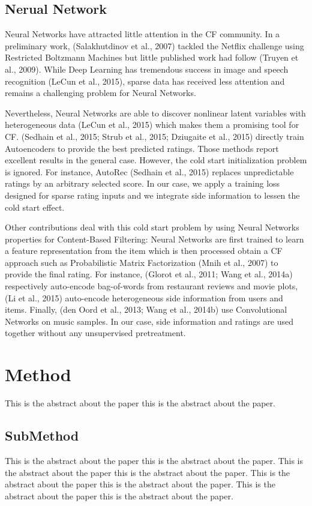 \documentclass{sig-alternate-05-2015}
\begin{document}
\subsection{Nerual Network}
Neural Networks have attracted little attention in the CF community.
In a preliminary work, (Salakhutdinov et al., 2007) tackled the Netflix challenge using Restricted Boltzmann Machines but little published work had follow (Truyen et al., 2009).
While Deep Learning has tremendous success in image and speech recognition (LeCun
et al., 2015), sparse data has received less attention and remains a challenging problem for Neural Networks.

Nevertheless, Neural Networks are able to discover nonlinear latent variables with heterogeneous data (LeCun et al., 2015) which makes them a promising tool for CF.
(Sedhain et al., 2015; Strub et al., 2015; Dziugaite et al., 2015) directly train Autoencoders to provide the best predicted ratings.
Those methods report excellent results in the general case.
However, the cold start initialization problem is ignored.
For instance, AutoRec (Sedhain et al., 2015) replaces unpredictable ratings by an arbitrary selected score.
In our case, we apply a training loss designed for sparse rating inputs and we integrate side information to lessen the cold start effect.

Other contributions deal with this cold start problem by using Neural Networks properties for Content-Based Filtering: Neural Networks are first trained to learn a feature representation from the item which is then processed obtain a CF approach such as Probabilistic Matrix Factorization (Mnih et al., 2007) to provide the final rating.
For instance, (Glorot et al., 2011; Wang et al., 2014a) respectively auto-encode bag-of-words from restaurant reviews and movie plots, (Li et al., 2015) auto-encode heterogeneous side information from users and items.
Finally, (den Oord et al., 2013; Wang et al., 2014b) use Convolutional Networks on music samples.
In our case, side information and ratings are used together without any unsupervised
pretreatment.


\section{Method}
This is the abstract about the paper this is the abstract about the paper.

\subsection{SubMethod}
This is the abstract about the paper this is the abstract about the paper.
This is the abstract about the paper this is the abstract about the paper.
This is the abstract about the paper this is the abstract about the paper.
This is the abstract about the paper this is the abstract about the paper.
\end{document}
